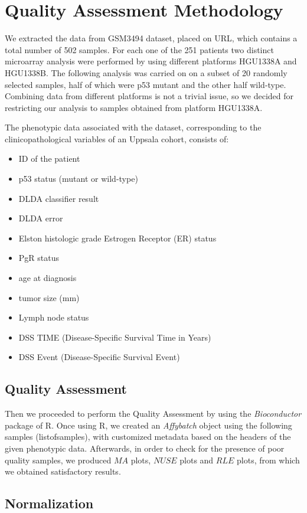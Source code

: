 \documentclass{article}
\begin{document}
\section{Quality Assessment Methodology}
We extracted the data from GSM3494 dataset, placed on URL, which contains a total number of 502 samples. For each one of the 251 patients two distinct microarray analysis were performed by using different platforms HGU1338A and HGU1338B. The following analysis was carried on on a subset of 20 randomly selected samples, half of which were p53 mutant and the other half wild-type. Combining data from different platforms is not a trivial issue, so we decided for restricting our analysis to samples obtained from platform HGU1338A.\par
The phenotypic data associated with the dataset, corresponding to the clinicopathological variables of an Uppsala cohort, consists of:
\begin{itemize}
	\item ID of the patient
	\item p53 status (mutant or wild-type)
	\item DLDA classifier result
	\item DLDA error
	\item Elston histologic grade Estrogen Receptor (ER) status
	\item PgR status
	\item age at diagnosis
	\item tumor size (mm) 
	\item Lymph node status
	\item DSS TIME (Disease-Specific Survival Time in Years) 
	\item DSS Event (Disease-Specific Survival Event)
\end{itemize}

\subsection{Quality Assessment}
	Then we proceeded to perform the Quality Assessment by using the {\it Bioconductor} package of R. Once using R, we created an {\it Affybatch} object using the following samples (listofsamples), with customized metadata based on the headers of the given phenotypic data. Afterwards, in order to check for the presence of poor quality samples, we produced $MA$ plots, $NUSE$ plots and $RLE$ plots, from which we obtained satisfactory results.\par

\subsection{Normalization}
\end{document}
